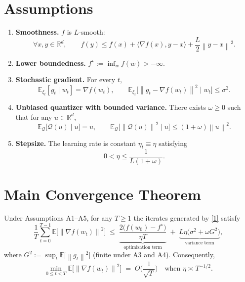 \documentclass{article}
\newcommand{\E}{\mathbb{E}}
\newcommand{\R}{\mathbb{R}}
\newcommand{\norm}[1]{\left\lVert #1\right\rVert}
\newcommand{\ip}[2]{\langle #1,#2\rangle}
\newcommand{\Q}{\mathcal{Q}}
\newcommand{\grad}{\nabla}
\begin{document}
\newpage
\section*{Assumptions}
\begin{enumerate}[label={A\arabic*}.]
\item \textbf{Smoothness.} $f$ is $L$‑smooth:
\[
\forall x,y\in\R^d,\qquad
f(y)\le f(x)+\ip{\grad f(x)}{y-x}+\frac{L}{2}\norm{y-x}^2 .
\tag{A1}
\]
\item \textbf{Lower boundedness.} $f^{\star}:=\inf_{w}f(w)>-\infty$.
\item \textbf{Stochastic gradient.} For every $t$,
\[
\E_{\xi_t}[g_t\mid w_t]=\grad f(w_t),\qquad
\E_{\xi_t}\!\big[\norm{g_t-\grad f(w_t)}^2\mid w_t\big]\le\sigma^2 .
\tag{A3}
\]
\item \textbf{Unbiased quantizer with bounded variance.} There exists $\omega\ge0$ such that for any $u\in\R^d$,
\[
\E_{\Q}\!\big[\Q(u)\mid u\big]=u,\qquad
\E_{\Q}\!\big[\norm{\Q(u)}^2\mid u\big]\le (1+\omega)\norm{u}^2 .
\tag{A4}
\]
\item \textbf{Stepsize.} The learning rate is constant $\eta_t\equiv\eta$ satisfying
\[
0<\eta\le\frac{1}{L(1+\omega)} .
\tag{A5}
\]
\end{enumerate}

\section*{Main Convergence Theorem}
\begin{theorem}\label{thm:main}
Under Assumptions A1–A5, for any $T\ge1$ the iterates generated by \eqref{1} satisfy
\[
\frac{1}{T}\sum_{t=0}^{T-1}\E\!\big[\norm{\grad f(w_t)}^2\big]
\;\le\;
\underbrace{\frac{2\big(f(w_0)-f^{\star}\big)}{\eta T}}_{\text{optimization term}}
\;+\;
\underbrace{L\eta\big(\sigma^2+\omega G^2\big)}_{\text{variance term}},
\tag{2}
\]
where $G^2:=\sup_{t}\E\!\big[\norm{g_t}^2\big]$ (finite under A3 and A4). Consequently,
\[
\min_{0\le t<T}\E\!\big[\norm{\grad f(w_t)}^2\big]\;=\;O\!\Big(\frac{1}{\sqrt{T}}\Big)
\quad\text{when }\eta\asymp T^{-1/2}.
\]
\end{theorem}
\end{document}
